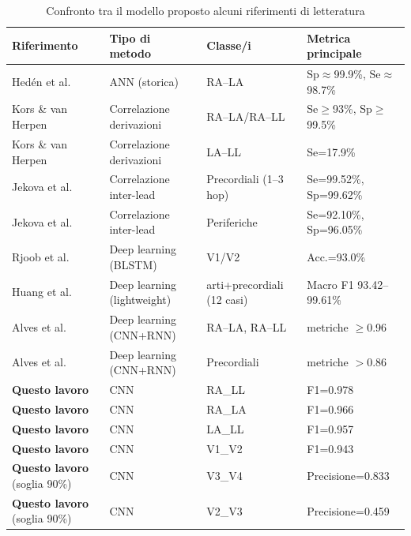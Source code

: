 \begin{table}[htbp]
	\centering
	\caption{Confronto tra il modello proposto alcuni riferimenti di letteratura}
	\label{tab:sota_confronto}
	\scriptsize
	\begin{tabular}{p{3.3cm} p{2.6cm} p{2.6cm} p{2cm}}
		\toprule
		Riferimento & Tipo di metodo & Classe/i & Metrica principale \\
		\midrule
		Hedén et al. \cite{heden1995ann} & ANN (storica) & RA--LA & Sp$\approx$99.9\%, Se$\approx$98.7\% \\
		Kors \& van Herpen \cite{kors2001accurate} & Correlazione derivazioni & RA--LA/RA--LL & Se$\ge$93\%, Sp$\ge$99.5\% \\
		Kors \& van Herpen \cite{kors2001accurate} & Correlazione derivazioni & LA--LL & Se=17.9\% \\
		Jekova et al. \cite{jekova2016interlead} & Correlazione inter-lead & Precordiali (1--3 hop) & Se=99.52\%, Sp=99.62\% \\
		Jekova et al. \cite{jekova2016interlead} & Correlazione inter-lead & Periferiche & Se=92.10\%, Sp=96.05\% \\
		Rjoob et al. \cite{rjoob2021jmir} & Deep learning (BLSTM) & V1/V2 & Acc.=93.0\% \\
		Huang et al. \cite{huang2024lightweight} & Deep learning (lightweight) & arti+precordiali (12 casi) & Macro F1 93.42--99.61\% \\
		Alves et al. \cite{alves2025telecardiology} & Deep learning (CNN+RNN) & RA--LA, RA--LL & metriche $\geq$0.96 \\
		Alves et al. \cite{alves2025telecardiology} & Deep learning (CNN+RNN) & Precordiali & metriche $>$0.86 \\
		\midrule
		\textbf{Questo lavoro} & CNN & RA\_LL & F1=0.978 \\
		\textbf{Questo lavoro} & CNN & RA\_LA & F1=0.966 \\
		\textbf{Questo lavoro} & CNN & LA\_LL & F1=0.957 \\
		\textbf{Questo lavoro} & CNN & V1\_V2 & F1=0.943 \\
		\textbf{Questo lavoro} (soglia 90\%) & CNN & V3\_V4 & Precisione=0.833 \\
		\textbf{Questo lavoro} (soglia 90\%) & CNN & V2\_V3 & Precisione=0.459 \\
		\bottomrule
	\end{tabular}
\end{table}

